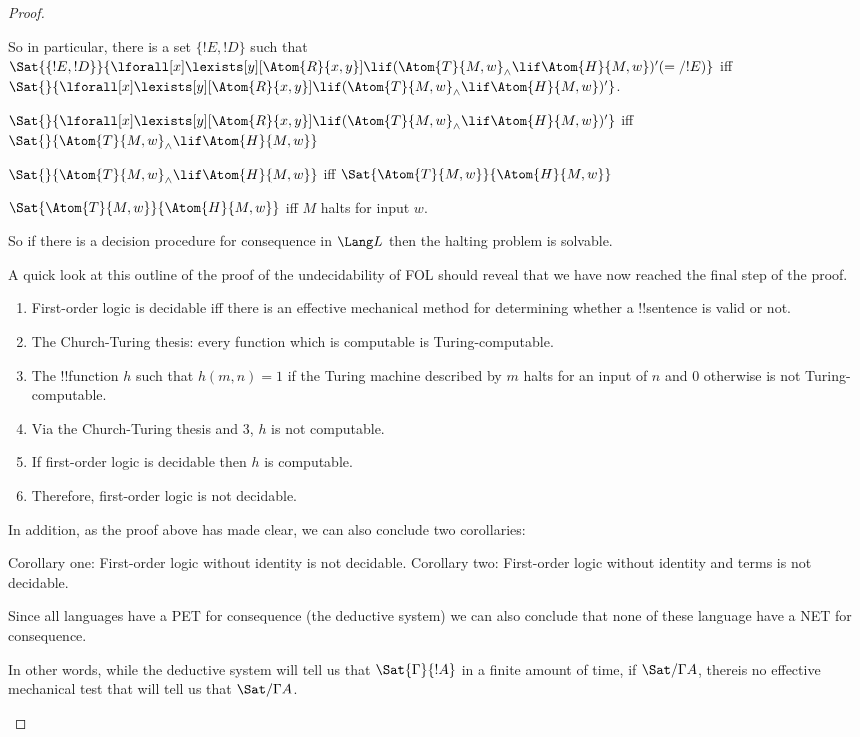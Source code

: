 \documentclass[../../include/open-logic-section]{subfiles}
\begin{document}
\begin{proof}
\begin{enumerate}
So in particular, there is a set $\{ !E, !D \}$ such that $\Sat{\{!E, !D\}
}{\lforall[x]\lexists[y][\Atom{R}{x,y}]\lif (\Atom{T}{M,w}_\land \lif
\Atom{H}{M,w})'(=/!E)}$
iff $\Sat{}{\lforall[x]\lexists[y][\Atom{R}{x,y}]\lif (\Atom{T}{M,w}_\land
\lif \Atom{H}{M,w})'}$.

$\Sat{}{\lforall[x]\lexists[y][\Atom{R}{x,y}]\lif (\Atom{T}{M,w}_\land
\lif\Atom{H}{M,w})'}$
iff $\Sat{}{\Atom{T}{M,w}_\land \lif \Atom{H}{M,w}}$

$\Sat{}{\Atom{T}{M,w}_\land \lif \Atom{H}{M,w}}$ iff
$\Sat{\Atom{T}{M,w}}{\Atom{H}{M,w}}$

$\Sat{\Atom{T}{M,w}}{\Atom{H}{M,w}}$ iff $M$ halts for input $w$.

So if there is a decision procedure for consequence in $\Lang L$ then the
halting problem is solvable.

A quick look at this outline of the proof of the undecidability of FOL
should reveal that we have now reached the final step of the proof.

\begin{enumerate}
\item First-order logic is decidable iff there is an effective mechanical
method for determining whether a !!{sentence} is valid or not.
\item The Church-Turing thesis: every function which is computable is
Turing-computable.
\item The !!{function} $h$ such that $h(m,n) = 1$ if the Turing machine
described by $m$ halts for an input of $n$ and $0$ otherwise is not
Turing-computable.
\item Via the Church-Turing thesis and 3, $h$ is not computable.
\item If first-order logic is decidable then $h$ is computable.
\item Therefore, first-order logic is not decidable.
\end{enumerate}

In addition, as the proof above has made clear, we can also conclude two
corollaries:

Corollary one: First-order logic without identity is not decidable.
Corollary two: First-order logic without identity and terms is not
decidable.

Since all languages have a PET for consequence (the deductive system) we
can also conclude that none of these language have a NET for consequence.

In other words, while the deductive system will tell us that
$\Sat{\Gamma}{!A}$ in a finite amount of time, if $\Sat/{\Gamma}{A}$,
thereis no effective mechanical test that will tell us that
$\Sat/{\Gamma}{A}$.
\end{enumerate}
\end{proof}
\end{document}
